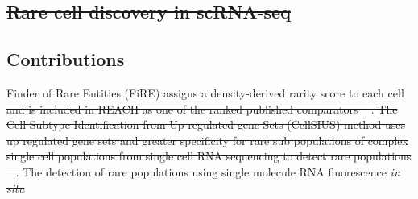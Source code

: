 \documentclass[10pt]{article}
\providecommand{\DIFaddtex}[1]{{\protect\color{trackgreen}#1}} %
\providecommand{\DIFdeltex}[1]{{\protect\color{red}\sout{#1}}}                      %
\providecommand{\DIFaddbegin}{} %
\providecommand{\DIFaddend}{} %
\providecommand{\DIFdelbegin}{} %
\providecommand{\DIFdelend}{} %
\providecommand{\DIFadd}[1]{\texorpdfstring{\DIFaddtex{#1}}{#1}} %
\providecommand{\DIFdel}[1]{\texorpdfstring{\DIFdeltex{#1}}{}} %
\newcommand{\DIFscaledelfig}{0.5}
\newlength{\DIFdelgraphicswidth} %
\newlength{\DIFdelgraphicsheight} %
\newcommand{\DIFaddincludegraphics}[2][]{{\color{trackgreen}\fbox{\DIFOincludegraphics[#1]{#2}}}} %
\newcommand{\DIFdelincludegraphics}[2][]{%
\sbox{\DIFdelgraphicsbox}{\DIFOincludegraphics[#1]{#2}}%
\settoboxwidth{\DIFdelgraphicswidth}{\DIFdelgraphicsbox} %
\settoboxtotalheight{\DIFdelgraphicsheight}{\DIFdelgraphicsbox} %
\scalebox{\DIFscaledelfig}{%
\parbox[b]{\DIFdelgraphicswidth}{\usebox{\DIFdelgraphicsbox}\\[-\baselineskip] \rule{\DIFdelgraphicswidth}{0em}}\llap{\resizebox{\DIFdelgraphicswidth}{\DIFdelgraphicsheight}{%
\setlength{\unitlength}{\DIFdelgraphicswidth}%
\begin{picture}(1,1)%
\thicklines\linethickness{2pt} %
{\color[rgb]{1,0,0}\put(0,0){\framebox(1,1){}}}%
{\color[rgb]{1,0,0}\put(0,0){\line( 1,1){1}}}%
{\color[rgb]{1,0,0}\put(0,1){\line(1,-1){1}}}%
\end{picture}%
}\hspace*{3pt}}} %
} %
\DeclareRobustCommand{\DIFaddbegin}{\DIFOaddbegin \let\includegraphics\DIFaddincludegraphics} %
\DeclareRobustCommand{\DIFaddend}{\DIFOaddend \let\includegraphics\DIFOincludegraphics} %
\DeclareRobustCommand{\DIFdelbegin}{\DIFOdelbegin \let\includegraphics\DIFdelincludegraphics} %
\DeclareRobustCommand{\DIFdelend}{\DIFOaddend \let\includegraphics\DIFOincludegraphics} %
\begin{document}
\DIFdelbegin \subsection{\DIFdel{Rare cell discovery in scRNA-seq}}
\addtocounter{subsection}{-1}%
\DIFdelend \DIFaddbegin \subsection{\DIFadd{Contributions}}\label{contributions}
\DIFaddend 

\DIFdelbegin \DIFdel{Finder of Rare Entities (FiRE) assigns a density-derived rarity score to each cell and is included in REACH as one of the ranked published comparators \mbox{%
\cite{martens2023rarity}}\hskip0pt%
. The Cell Subtype Identification from Up regulated gene Sets (CellSIUS) method uses up regulated gene sets and greater specificity for rare sub populations of complex single cell populations from single cell RNA sequencing to detect rare populations \mbox{%
\cite{wegmann2019cellsius}}\hskip0pt%
. The detection of rare populations using single molecule RNA fluorescence }\textit{\DIFdel{in situ}} %
\end{document}
